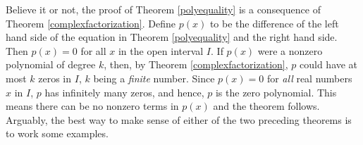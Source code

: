 \documentclass{ximera}
\begin{document}


 

Believe it or not, the proof of Theorem \ref{polyequality} is a consequence of Theorem \ref{complexfactorization}.  Define $p(x)$ to be the difference of the left hand side of the equation in Theorem \ref{polyequality} and the right hand side.  Then $p(x) = 0$ for all $x$ in the open interval $I$.  If $p(x)$ were a nonzero polynomial of degree $k$, then, by Theorem \ref{complexfactorization}, $p$ could have at most $k$ zeros in $I$, $k$ being a \textit{finite} number.  Since $p(x) = 0$ for \textit{all} real numbers $x$ in $I$, $p$ has infinitely many zeros, and hence, $p$ is the zero polynomial.  This means there can be no nonzero terms in $p(x)$ and the theorem follows.  Arguably, the best way to make sense of either of the two preceding theorems is to work some examples.  
\end{document}

